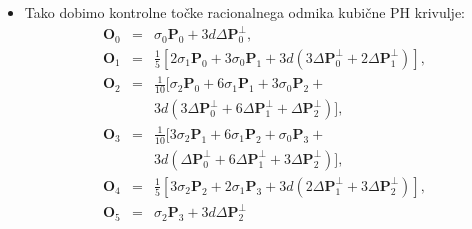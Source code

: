\documentclass[12pt]{beamer}
\theoremstyle{definition} %
\theoremstyle{plain} %
\begin{document}
    \begin{frame}
        \begin{itemize}
            \item Tako dobimo kontrolne točke racionalnega odmika kubične PH krivulje:
                \begin{eqnarray}
                    \textbf{O}_0 &=& \sigma_0 \textbf{P}_0 + 3 d \Delta \textbf{P}_0^{\perp},\nonumber \\
                    \textbf{O}_1 &=& \frac{1}{5} [2 \sigma_1 \textbf{P}_0 + 3\sigma_0 \textbf{P}_1 + 3 d (3 \Delta \textbf{P}_0^{\perp} + 2 \Delta \textbf{P}_1^{\perp})],\nonumber \\
                    \textbf{O}_2 &=& \frac{1}{10} [\sigma_2 \textbf{P}_0 + 6\sigma_1 \textbf{P}_1 + 3\sigma_0 \textbf{P}_2 + \nonumber \\
                        & & 3 d (3 \Delta \textbf{P}_0^{\perp} + 6 \Delta \textbf{P}_1^{\perp} + \Delta \textbf{P}_2^{\perp})],\nonumber \\
                    \textbf{O}_3 &=& \frac{1}{10} [3\sigma_2 \textbf{P}_1 + 6\sigma_1 \textbf{P}_2 + \sigma_0 \textbf{P}_3 + \nonumber \\
                        & & 3 d (\Delta \textbf{P}_0^{\perp} + 6 \Delta \textbf{P}_1^{\perp} + 3 \Delta \textbf{P}_2^{\perp})],\nonumber \\
                    \textbf{O}_4 &=& \frac{1}{5} [3\sigma_2 \textbf{P}_2 + 2\sigma_1 \textbf{P}_3 + 3 d (2\Delta \textbf{P}_1^{\perp} + 3 \Delta \textbf{P}_2^{\perp})],\nonumber \\
                    \textbf{O}_5 &=& \sigma_2 \textbf{P}_3 + 3 d \Delta \textbf{P}_2^{\perp}\nonumber
                \end{eqnarray}
                
        \end{itemize}
    \end{frame}
\end{document}
